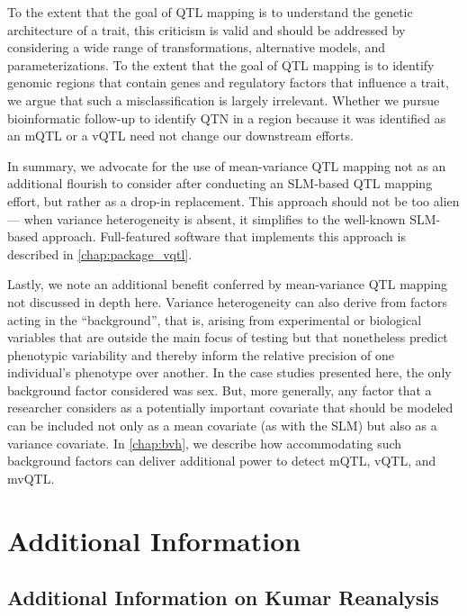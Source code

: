     To the extent that the goal of QTL mapping is to understand the genetic architecture of a trait, this criticism is valid and should be addressed by considering a wide range of transformations, alternative models, and parameterizations.
    To the extent that the goal of QTL mapping is to identify genomic regions that contain genes and regulatory factors that influence a trait, we argue that such a misclassification is largely irrelevant.
    Whether we pursue bioinformatic follow-up to identify QTN in a region because it was identified as an mQTL or a vQTL need not change our downstream efforts.

    In summary, we advocate for the use of mean-variance QTL mapping not as an additional flourish to consider after conducting an SLM-based QTL mapping effort, but rather as a drop-in replacement.
    This approach should not be too alien --- when variance heterogeneity is absent, it simplifies to the well-known SLM-based approach.
    Full-featured software that implements this approach is described in \autoref{chap:package_vqtl}.

    Lastly, we note an additional benefit conferred by mean-variance QTL mapping not discussed in depth here.
    Variance heterogeneity can also derive from factors acting in the ``background'', that is, arising from experimental or biological variables that are outside the main focus of testing but that nonetheless predict phenotypic variability and thereby inform the relative precision of one individual's phenotype over another.
    In the case studies presented here, the only background factor considered was sex.
    But, more generally, any factor that a researcher considers as a potentially important covariate that should be modeled can be included not only as a mean covariate (as with the SLM) but also as a variance covariate.
    In \autoref{chap:bvh}, we describe how accommodating such background factors can deliver additional power to detect mQTL, vQTL, and mvQTL.


\FloatBarrier
\clearpage
\section{Additional Information}
    
    
    \subsection{Additional Information on Kumar Reanalysis}

